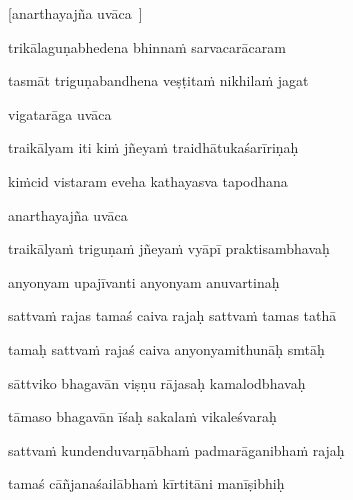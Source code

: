 \jump\jump
\vers

[anarthayajña uvāca~{\dandab}\dontdisplaylinenum ]

trikālaguṇabhedena bhinna\.m sarvacarācaram\thinspace{\danda} \dontdisplaylinenum

tasmāt triguṇabandhena veṣṭita\.m nikhila\.m jagat \veg\dontdisplaylinenum

vigatarāga uvāca~{\dandab}\dontdisplaylinenum 

traikālyam iti ki\.m jñeya\.m traidhātukaśarīriṇaḥ\thinspace{\danda} \dontdisplaylinenum

ki\.mcid vistaram eveha kathayasva tapodhana \veg\dontdisplaylinenum

anarthayajña uvāca~{\dandab}\dontdisplaylinenum 

traikālya\.m triguṇa\.m jñeya\.m vyāpī praktisambhavaḥ\thinspace{\danda} \dontdisplaylinenum

anyonyam upajīvanti anyonyam anuvartinaḥ \veg\dontdisplaylinenum

sattva\.m rajas tamaś caiva rajaḥ sattva\.m tamas tathā\thinspace{\dandab} \dontdisplaylinenum

tamaḥ sattva\.m rajaś caiva anyonyamithunāḥ smtāḥ \veg\dontdisplaylinenum

sāttviko bhagavān viṣṇu rājasaḥ kamalodbhavaḥ\thinspace{\dandab} \dontdisplaylinenum

tāmaso bhagavān īśaḥ sakala\.m vikaleśvaraḥ \veg\dontdisplaylinenum

sattva\.m kundenduvarṇābha\.m padmarāganibha\.m rajaḥ\thinspace{\dandab} \dontdisplaylinenum

tamaś cāñjanaśailābha\.m kīrtitāni manīṣibhiḥ \veg\dontdisplaylinenum

